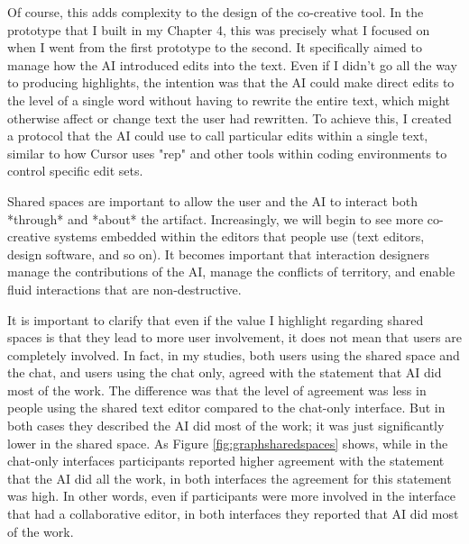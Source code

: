 Of course, this adds complexity to the design of the co-creative tool. In the prototype that I built in my Chapter 4, this was precisely what I focused on when I went from the first prototype to the second. It specifically aimed to manage how the AI introduced edits into the text. Even if I didn't go all the way to producing highlights, the intention was that the AI could make direct edits to the level of a single word without having to rewrite the entire text, which might otherwise affect or change text the user had rewritten. To achieve this, I created a protocol that the AI could use to call particular edits within a single text, similar to how Cursor uses "rep" and other tools within coding environments to control specific edit sets.

Shared spaces are important to allow the user and the AI to interact both *through* and *about* the artifact. Increasingly, we will begin to see more co-creative systems embedded within the editors that people use (text editors, design software, and so on). It becomes important that interaction designers manage the contributions of the AI, manage the conflicts of territory, and enable fluid interactions that are non-destructive.

It is important to clarify that even if the value I highlight regarding shared spaces is that they lead to more user involvement, it does not mean that users are completely involved. In fact, in my studies, both users using the shared space and the chat, and users using the chat only, agreed with the statement that AI did most of the work. The difference was that the level of agreement was less in people using the shared text editor compared to the chat-only interface. But in both cases they described the AI did most of the work; it was just significantly lower in the shared space. As Figure \ref{fig:graphsharedspaces} shows, while in the chat-only interfaces participants reported higher agreement with the statement that the AI did all the work, in both interfaces the agreement for this statement was high. In other words, even if participants were more involved in the interface that had a collaborative editor, in both interfaces they reported that AI did most of the work.

